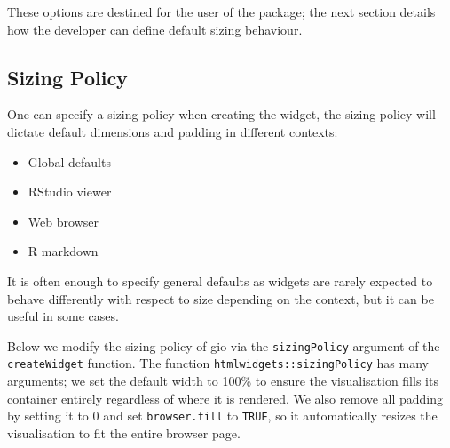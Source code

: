 \documentclass[10pt,]{krantz}
\makeatletter
\newenvironment{Shaded}{\begin{snugshade}}{\end{snugshade}}
\newcommand{\CommentTok}[1]{\textcolor[rgb]{0.37,0.37,0.37}{\textit{#1}}}
\newcommand{\DataTypeTok}[1]{\textcolor[rgb]{0.27,0.27,0.27}{#1}}
\newcommand{\DecValTok}[1]{\textcolor[rgb]{0.06,0.06,0.06}{#1}}
\newcommand{\KeywordTok}[1]{\textcolor[rgb]{0.27,0.27,0.27}{\textbf{#1}}}
\newcommand{\NormalTok}[1]{#1}
\newcommand{\OperatorTok}[1]{\textcolor[rgb]{0.43,0.43,0.43}{\textbf{#1}}}
\newcommand{\OtherTok}[1]{\textcolor[rgb]{0.37,0.37,0.37}{#1}}
\newcommand{\StringTok}[1]{\textcolor[rgb]{0.5,0.5,0.5}{#1}}
\providecommand{\tightlist}{%
  \setlength{\itemsep}{0pt}\setlength{\parskip}{0pt}}
\newenvironment{kframe}{%
\medskip{}
\setlength{\fboxsep}{.8em}
 \def\at@end@of@kframe{}%
 \ifinner\ifhmode%
  \def\at@end@of@kframe{\end{minipage}}%
  \begin{minipage}{\columnwidth}%
 \fi\fi%
 \def\FrameCommand##1{\hskip\@totalleftmargin \hskip-\fboxsep
 \colorbox{shadecolor}{##1}\hskip-\fboxsep
     \hskip-\linewidth \hskip-\@totalleftmargin \hskip\columnwidth}%
 \MakeFramed {\advance\hsize-\width
   \@totalleftmargin\z@ \linewidth\hsize
   \@setminipage}}%
 {\par\unskip\endMakeFramed%
 \at@end@of@kframe}
\renewenvironment{Shaded}{\begin{kframe}}{\end{kframe}}
\makeatother
\begin{document}
These options are destined for the user of the package; the next section details how the developer can define default sizing behaviour.

\hypertarget{widgets-adv-sizing-policy}{%
\subsection{Sizing Policy}\label{widgets-adv-sizing-policy}}

One can specify a sizing policy when creating the widget, the sizing policy will dictate default dimensions and padding in different contexts:

\begin{itemize}
\tightlist
\item
  Global defaults
\item
  RStudio viewer
\item
  Web browser
\item
  R markdown
\end{itemize}

It is often enough to specify general defaults as widgets are rarely expected to behave differently with respect to size depending on the context, but it can be useful in some cases.

Below we modify the sizing policy of gio via the \texttt{sizingPolicy} argument of the \texttt{createWidget} function. The function \texttt{htmlwidgets::sizingPolicy} has many arguments; we set the default width to 100\% to ensure the visualisation fills its container entirely regardless of where it is rendered. We also remove all padding by setting it to 0 and set \texttt{browser.fill} to \texttt{TRUE}, so it automatically resizes the visualisation to fit the entire browser page.

\begin{Shaded}
\end{Shaded}
\end{document}
